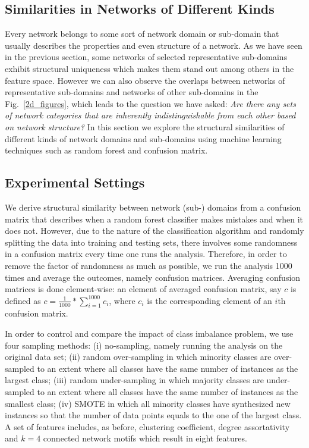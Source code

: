 \subsection*{Similarities in Networks of Different Kinds}
Every network belongs to some sort of network domain or sub-domain that usually describes the properties and even structure of a network. As we have seen in the previous section, some networks of selected representative sub-domains exhibit structural uniqueness which makes them stand out among others in the feature space. However we can also observe the overlaps between networks of representative sub-domains and networks of other sub-domains in the Fig.~\ref{2d_figures}, which leads to the question we have asked:  \textit{Are there any sets of network categories that are inherently indistinguishable from each other based on network structure?} In this section we explore the structural similarities of different kinds of network domains and sub-domains using machine learning techniques such as random forest and confusion matrix.  

\subsection*{Experimental Settings}
We derive structural similarity between network (sub-) domains from a confusion matrix that describes when a random forest classifier makes mistakes and when it does not. However, due to the nature of the classification algorithm and randomly splitting the data into training and testing sets, there involves some randomness in a confusion matrix every time one runs the analysis. Therefore, in order to remove the factor of randomness as much as possible, we run the analysis 1000 times and average the outcomes, namely confusion matrices. Averaging confusion matrices is done element-wise: an element of averaged confusion matrix, say $c$ is defined as $c = \frac{1}{1000}*\sum_{i=1}^{1000} c_i$, where $c_i$ is the corresponding element of an $i$th confusion matrix.

In order to control and compare the impact of class imbalance problem, we use four sampling methods: (i) no-sampling, namely running the analysis on the original data set; (ii) random over-sampling in which minority classes are over-sampled to an extent where all classes have the same number of instances as the largest class; (iii) random under-sampling in which majority classes are under-sampled to an extent where all classes have the same number of instances as the smallest class; (iv) SMOTE in which all minority classes have synthesized new instances so that the number of data points equals to the one of the largest class. A set of features includes, as before, clustering coefficient, degree assortativity and $k = 4$ connected network motifs which result in eight features.
 
